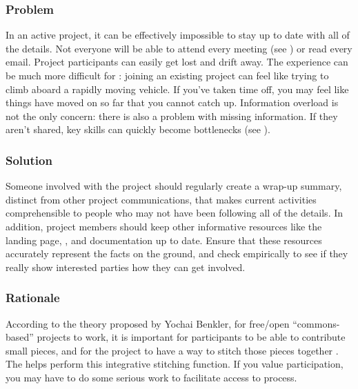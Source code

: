 \subsubsection*{Problem} In an active project, it can be effectively impossible to stay up to date with all of the details.  Not everyone will be able to attend every meeting (see ) or read every email.  Project participants can easily get lost and drift away.  The experience can be much more difficult for : joining an existing project can feel like trying to climb aboard a rapidly moving vehicle.  If you've taken time off, you may feel like things have moved on so far that you cannot catch up.  Information overload is not the only concern: there is also a problem with missing information.  If they aren't shared, key skills can quickly become bottlenecks (see ).

\subsubsection*{Solution}
Someone involved with the project should regularly create a wrap-up summary, distinct from other project communications, that makes current activities comprehensible to people who may not have been following all of the details.  In addition, project members should keep other informative resources like the landing page, , and documentation up to date.  Ensure that these resources accurately represent the facts on the ground, and check empirically to see if they really show interested parties how they can get involved.

\subsubsection*{Rationale}
According to the theory proposed by Yochai Benkler, for free/open ``commons-based'' projects to work, it is important for participants to be able to contribute small pieces, and for the project to have a way to stitch those pieces together \cite{coases-penguin}.  The  helps perform this integrative stitching function.  If you value participation, you may have to do some serious work to facilitate access to process.

